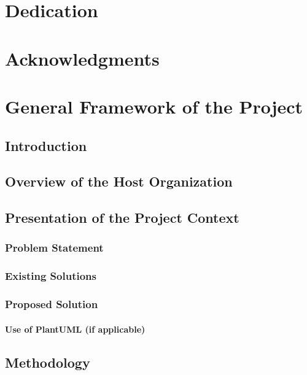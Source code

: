 \documentclass[a4paper,12pt]{report}
\begin{document}
\newpage
\thispagestyle{empty}
\mbox{}
\newpage

\chapter*{Dedication}
\newpage

\chapter*{Acknowledgments}
\newpage

\tableofcontents
\newpage

\listoffigures
\newpage

\listoftables
\newpage

\chapter{General Framework of the Project}

\section{Introduction}
\section{Overview of the Host Organization}
\section{Presentation of the Project Context}
\subsection{Problem Statement}
\subsection{Existing Solutions}
\subsection{Proposed Solution}
\subsubsection{Use of PlantUML (if applicable)}
\section{Methodology}
\end{document}
